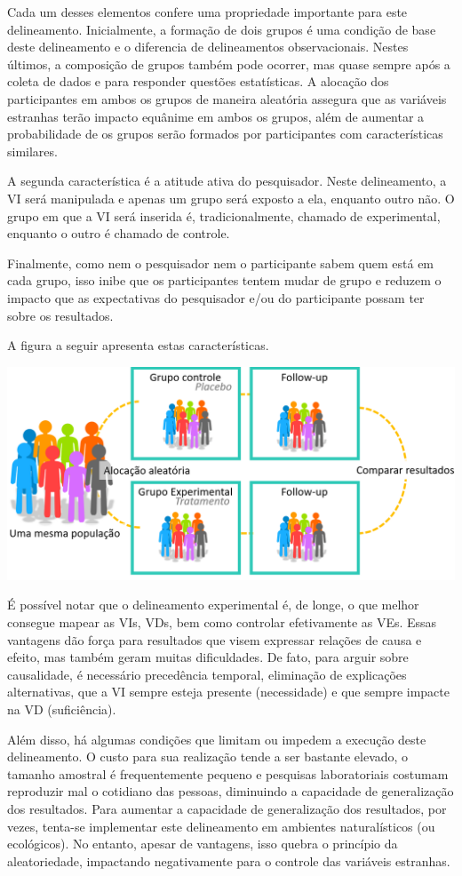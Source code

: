 \documentclass[
]{book}
\begin{document}
Cada um desses elementos confere uma propriedade importante para este delineamento. Inicialmente, a formação de dois grupos é uma condição de base deste delineamento e o diferencia de delineamentos observacionais. Nestes últimos, a composição de grupos também pode ocorrer, mas quase sempre após a coleta de dados e para responder questões estatísticas. A alocação dos participantes em ambos os grupos de maneira aleatória assegura que as variáveis estranhas terão impacto equânime em ambos os grupos, além de aumentar a probabilidade de os grupos serão formados por participantes com características similares.

A segunda característica é a atitude ativa do pesquisador. Neste delineamento, a VI será manipulada e apenas um grupo será exposto a ela, enquanto outro não. O grupo em que a VI será inserida é, tradicionalmente, chamado de experimental, enquanto o outro é chamado de controle.

Finalmente, como nem o pesquisador nem o participante sabem quem está em cada grupo, isso inibe que os participantes tentem mudar de grupo e reduzem o impacto que as expectativas do pesquisador e/ou do participante possam ter sobre os resultados.

A figura a seguir apresenta estas características.

\includegraphics{./img/cap_experimento.png}

É possível notar que o delineamento experimental é, de longe, o que melhor consegue mapear as VIs, VDs, bem como controlar efetivamente as VEs. Essas vantagens dão força para resultados que visem expressar relações de causa e efeito, mas também geram muitas dificuldades. De fato, para arguir sobre causalidade, é necessário precedência temporal, eliminação de explicações alternativas, que a VI sempre esteja presente (necessidade) e que sempre impacte na VD (suficiência).

Além disso, há algumas condições que limitam ou impedem a execução deste delineamento. O custo para sua realização tende a ser bastante elevado, o tamanho amostral é frequentemente pequeno e pesquisas laboratoriais costumam reproduzir mal o cotidiano das pessoas, diminuindo a capacidade de generalização dos resultados. Para aumentar a capacidade de generalização dos resultados, por vezes, tenta-se implementar este delineamento em ambientes naturalísticos (ou ecológicos). No entanto, apesar de vantagens, isso quebra o princípio da aleatoriedade, impactando negativamente para o controle das variáveis estranhas.
\end{document}
